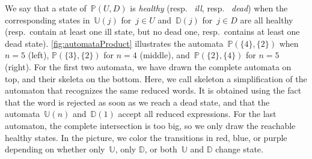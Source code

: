\documentclass{amsart}
\newcommand{\defn}[1]{\textsl{\color{darkblue} #1}} %
\newcommand{\automatonP}{\mathbb{P}} %
\newcommand{\automatonU}{\mathbb{U}} %
\newcommand{\automatonD}{\mathbb{D}} %
\begin{document}
We say that a state of~$\automatonP(U,D)$ is \defn{healthy} (resp.~\defn{ill}, resp.~\defn{dead}) when the corresponding states in~$\automatonU(j)$ for~$j \in U$ and~$\automatonD(j)$ for~$j \in D$ are all healthy (resp.~contain at least one ill state, but no dead one, resp.~contains at least one dead state).
\cref{fig:automataProduct} illustrates the automata~$\automatonP(\{4\},\{2\})$ when~$n = 5$ (left), $\automatonP(\{3\},\{2\})$ for $n=4$ (middle), and~$\automatonP(\{2\},\{4\})$ for $n=5$ (right).
For the first two automata, we have drawn the complete automata on top, and their skeleta on the bottom.
Here, we call skeleton a simplification of the automaton that recognizes the same reduced words.
It is obtained using the fact that the word is rejected as soon as we reach a dead state, and that the automata~$\automatonU(n)$ and~$\automatonD(1)$ accept all reduced expressions.
For the last automaton, the complete intersection is too big, so we only draw the reachable healthy states.
In the picture, we color the transitions in red, blue, or purple depending on whether only~$\automatonU$, only $\automatonD$, or both~$\automatonU$ and $\automatonD$ change state.
%
\end{document}
